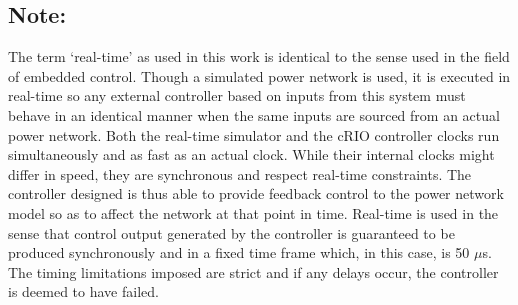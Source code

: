 \documentclass[a4paper, 10 pt, conference]{IEEEtran}
\begin{document}

\subsection*{Note:}
The term `real-time' as used in this work is identical to the sense used in the field of embedded control\cite{Real-Time}. Though a simulated power network is used, it is executed in real-time so any external controller based on inputs from this system must behave in an identical manner when the same inputs are sourced from an actual power network. Both the real-time simulator and the cRIO controller clocks run simultaneously and as fast as an actual clock. While their internal clocks might differ in speed, they are synchronous and respect real-time constraints. The controller designed is thus able to provide feedback control to the power network model so as to affect the network at that point in time. Real-time is used in the sense that control output generated by the controller is guaranteed to be produced synchronously and in a fixed time frame which, in this case, is 50 $\mu$s. The timing limitations imposed are strict and if any delays occur, the controller is deemed to have failed. 



\end{document}

